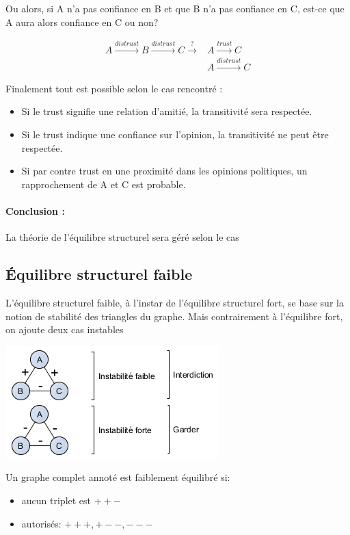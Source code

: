 Ou alors, si A n'a pas confiance en B et que B n'a pas confiance en C, est-ce que A aura alors confiance en C ou non?


\begin{align*}
A \overset{distrust}{\longrightarrow} B \overset{distrust}{\longrightarrow} C \overset{?}{\longrightarrow} &A \overset{trust}{\longrightarrow} C\\
&A \overset{distrust}{\longrightarrow} C
\end{align*}

Finalement tout est possible selon le cas rencontré : 
\begin{itemize}
\item Si le trust signifie une relation d'amitié, la transitivité sera respectée. 
\item Si le trust indique une confiance sur l’opinion, la transitivité ne peut être respectée. 
\item Si par contre trust en une proximité dans les opinions politiques, un rapprochement de A et C est probable. 
\end{itemize}


\paragraph{Conclusion :}La théorie de l'équilibre structurel sera géré selon le cas




\subsection{Équilibre structurel faible}
L'équilibre structurel faible, à l'instar de l'équilibre structurel fort, se base sur la
notion de stabilité des triangles du graphe. Mais contrairement à l'équilibre fort, on ajoute deux cas instables   

\includegraphics[scale=1]{images/22_Instabilite.png}

Un graphe complet annoté est faiblement équilibré si:
\begin{itemize}

\item aucun triplet est $++-$
\item autorisés: $+++, +--, ---$
\end{itemize}
